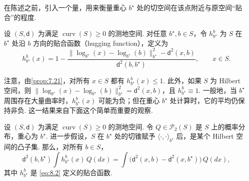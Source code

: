 在陈述之前，引入一个量，用来衡量重心 $b^\star$ 处的切空间在该点附近与原空间“贴合”的程度.
\begin{definition}[贴合]\label{def:8.2}
设 $(S,\mathsf d)$ 为满足 $\operatorname{curv}(S)\ge0$ 的测地空间. 对任意 $b^\star,b\in S$，令 $h_{b^\star}^b$ 为 $S$ 在 $b^\star$ 处沿 $b$ 方向的贴合函数（hugging function），定义为
\begin{equation}\label{eq:8.2}
h_{b^\star}^b(x)=1-
\frac{\|\log_{b^\star}(x)-\log_{b^\star}(b)\|_{b^\star}^2-\mathsf d^2(x,b)}
{\mathsf d^2(b,b^\star)},\qquad x\in S.
\end{equation}
\end{definition}
注意，由\autoref{prop:7.21}，对所有 $x\in S$ 都有 $h_{b^\star}^b(x)\le1$. 此外，如果 $S$ 为 Hilbert 空间，则 $\|\log_{b^\star}(x)-\log_{b^\star}(b)\|_{b^\star}^2=\mathsf d^2(x,b)$，且 $h_{b^\star}^b\equiv1$. 一般地，当 $b^\star$ 周围存在大量曲率时，$h_{b^\star}^b(x)$ 可能为负；但在重心 $b^\star$ 处计算时，它的平均仍保持非负. 这一结果来自下面这个简单而重要的观察.
\begin{theorem}[方差等式]\label{thm:8.3}
设 $(S,\mathsf d)$ 为满足 $\operatorname{curv}(S)\ge0$ 的测地空间. 令 $Q\in\mathcal P_2(S)$ 是 $S$ 上的概率分布，重心为 $b^\star$. 进一步假设，$S$ 在 $b^\star$ 处的切锥赋予 $\langle\cdot,\cdot\rangle_{b^\star}$ 后，是某个 Hilbert 空间的凸子集. 那么，对所有 $b\in S$，
\begin{equation}\label{eq:8.3}
\mathsf d^2(b,b^\star)\int h_{b^\star}^b(x)\,Q(dx)
=\int\bigl(\mathsf d^2(x,b)-\mathsf d^2(x,b^\star)\bigr)\,Q(dx),
\end{equation}
其中 $h_{b^\star}^b$ 是 \eqref{eq:8.2} 定义的贴合函数.
\end{theorem}
